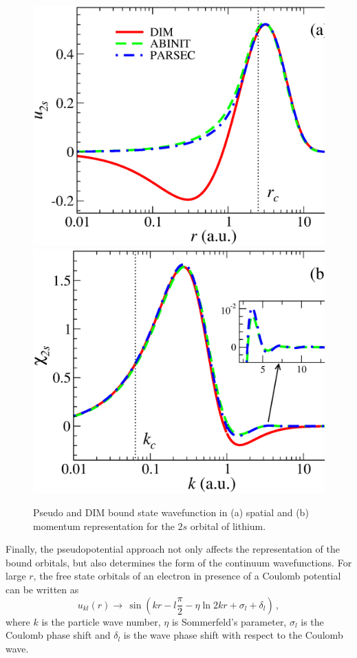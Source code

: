 \documentclass[10pt]{article}
\begin{document}
\begin{figure}[H]
\centering
 \includegraphics[height=0.23\textheight]{figures/pseudopot/funcLi.eps}
\hspace{0.2cm}
 \includegraphics[height=0.23\textheight]{figures/pseudopot/funckLi.eps}
 \caption{Pseudo and DIM bound state wavefunction in (a) spatial
 and (b) momentum representation for the
 $2s$ orbital of lithium.}
 \label{fig:wavesLi}
\end{figure}

Finally, the pseudopotential approach not only affects the 
representation of the bound orbitals, but also determines the form of 
the continuum wavefunctions. For large $r$, the free state orbitals of 
an electron in presence of a Coulomb potential can be written as
\begin{equation}
 u_{kl}(r) \rightarrow \,\sin \left( kr - l\frac{\pi}{2} - \eta \ln 2kr +
 \sigma_l + \delta_l \right)\,,
\end{equation}
where $k$ is the particle wave number, $\eta$ is Sommerfeld's 
parameter, $\sigma_l$ is the Coulomb phase shift and $\delta_l$ is the 
wave phase shift with respect to the Coulomb wave.
\end{document}
